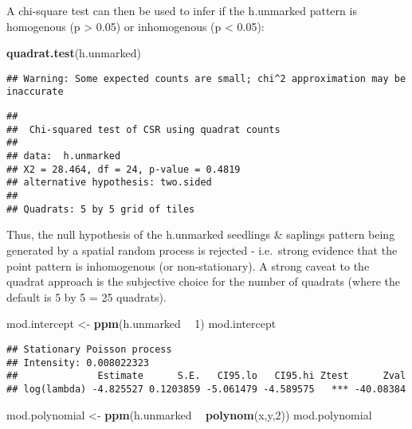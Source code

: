 \documentclass[]{article}
\newenvironment{Shaded}{\begin{snugshade}}{\end{snugshade}}
\newcommand{\DecValTok}[1]{\textcolor[rgb]{0.00,0.00,0.81}{#1}}
\newcommand{\KeywordTok}[1]{\textcolor[rgb]{0.13,0.29,0.53}{\textbf{#1}}}
\newcommand{\NormalTok}[1]{#1}
\newcommand{\OperatorTok}[1]{\textcolor[rgb]{0.81,0.36,0.00}{\textbf{#1}}}
\newcommand{\StringTok}[1]{\textcolor[rgb]{0.31,0.60,0.02}{#1}}
\begin{document}
A chi-square test can then be used to infer if the h.unmarked pattern is
homogenous (p \textgreater{} 0.05) or inhomogenous (p \textless{} 0.05):

\begin{Shaded}
\begin{Highlighting}[]
\KeywordTok{quadrat.test}\NormalTok{(h.unmarked)}
\end{Highlighting}
\end{Shaded}

\begin{verbatim}
## Warning: Some expected counts are small; chi^2 approximation may be inaccurate
\end{verbatim}

\begin{verbatim}
## 
##  Chi-squared test of CSR using quadrat counts
## 
## data:  h.unmarked
## X2 = 28.464, df = 24, p-value = 0.4819
## alternative hypothesis: two.sided
## 
## Quadrats: 5 by 5 grid of tiles
\end{verbatim}

Thus, the null hypothesis of the h.unmarked seedlings \& saplings
pattern being generated by a spatial random process is rejected -
i.e.~strong evidence that the point pattern is inhomogenous (or
non-stationary). A strong caveat to the quadrat approach is the
subjective choice for the number of quadrats (where the default is 5 by
5 = 25 quadrats).

\begin{Shaded}
\begin{Highlighting}[]
\NormalTok{mod.intercept <-}\StringTok{ }\KeywordTok{ppm}\NormalTok{(h.unmarked }\OperatorTok{~}\StringTok{ }\DecValTok{1}\NormalTok{)}
\NormalTok{mod.intercept}
\end{Highlighting}
\end{Shaded}

\begin{verbatim}
## Stationary Poisson process
## Intensity: 0.008022323
##              Estimate      S.E.   CI95.lo   CI95.hi Ztest      Zval
## log(lambda) -4.825527 0.1203859 -5.061479 -4.589575   *** -40.08384
\end{verbatim}

\begin{Shaded}
\begin{Highlighting}[]
\NormalTok{mod.polynomial <-}\StringTok{ }\KeywordTok{ppm}\NormalTok{(h.unmarked }\OperatorTok{~}\StringTok{ }\KeywordTok{polynom}\NormalTok{(x,y,}\DecValTok{2}\NormalTok{))}
\NormalTok{mod.polynomial}
\end{Highlighting}
\end{Shaded}
\end{document}

